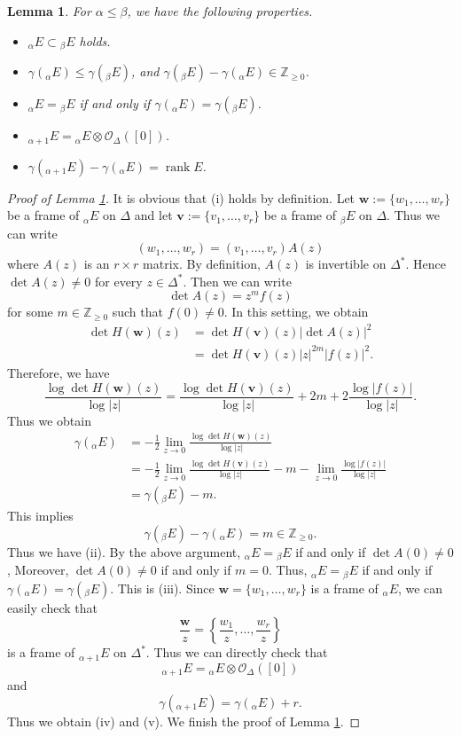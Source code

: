 \documentclass[12pt,twoside]{amsart}
\DeclareMathOperator{\rank}{rank}
\newtheorem{lem}[thm]{Lemma}
\theoremstyle{definition}
\begin{document}
\begin{lem}\label{p-lem7.8}
For $\alpha \leq \beta$, we have the following properties. 
\begin{itemize}
\item[(i)] ${}_\alpha E\subset {}_\beta E$ holds. 
\item[(ii)] $\gamma ({}_\alpha E)\leq \gamma 
({}_\beta E)$, and $\gamma ({}_\beta E)-\gamma ({}_\alpha E)\in 
\mathbb Z_{\geq 0}$. 
\item[(iii)] ${}_\alpha E={}_\beta E$ if and only if 
$\gamma({}_\alpha E)=\gamma ({}_\beta E)$. 
\item[(iv)] ${}_{\alpha +1}E={}_\alpha E\otimes \mathcal O_{\Delta}([0])$. 
\item[(v)] $\gamma ({}_{\alpha +1}E)-\gamma ({}_\alpha E)=\rank E$. 
\end{itemize}
\end{lem}

\begin{proof}[Proof of Lemma \ref{p-lem7.8}]
It is obvious that (i) holds by definition. 
Let $\bm w:=\{w_1, \ldots, w_r\}$ be a frame of ${}_\alpha E$ on 
$\Delta$ and let $\bm v:=\{v_1, \ldots, v_r\}$ be a frame of ${}_\beta E$ on $\Delta$. 
Thus we can write 
\[
(w_1, \ldots, w_r)=(v_1, \ldots, v_r)A(z)
\] 
where $A(z)$ is an $r\times r$ matrix. 
By definition, $A(z)$ is invertible on $\Delta^*$. 
Hence $\det A(z)\ne 0$ for every $z\in \Delta^*$. 
Then we can write 
\[
\det A(z)=z^mf(z)
\] 
for some $m\in \mathbb Z_{\geq 0}$ such that $f(0)\ne 0$. 
In this setting, 
we obtain 
\[
\begin{split}
\det H(\bm w)(z) &=\det H(\bm v)(z)|\det A(z)|^2\\ 
&= \det H(\bm v)(z) |z|^{2m}|f(z)|^2.  
\end{split} 
\] 
Therefore, we have 
\[
\frac{\log \det H(\bm w)(z)}{\log |z|} 
=\frac{\log \det H(\bm v)(z)}{\log |z|}+2m 
+2\frac{\log|f(z)|}{\log |z|}. 
\] 
Thus we obtain 
\[
\begin{split}
\gamma ({}_\alpha E)&= 
-\frac{1}{2} \lim_{z\to 0} \frac{\log \det H(\bm w)(z)}{\log |z|}\\ 
&=-\frac{1}{2} \lim_{z\to 0} \frac{\log \det H(\bm v)(z)}{\log |z|}
-m-\lim _{z\to 0} \frac{\log |f(z)|}{\log |z|}\\ 
&=\gamma ({}_\beta E)-m. 
\end{split}
\]
This implies 
\[
\gamma ({}_\beta E)-\gamma ({}_\alpha E)=m\in \mathbb Z_{\geq 0}. 
\] 
Thus we have (ii). 
By the above argument, ${}_\alpha E={}_\beta E$ if and only if 
$\det A(0)\ne 0$, 
Moreover, $\det A(0)\ne 0$ if and only if $m=0$. 
Thus, ${}_\alpha E={}_\beta E$ if and only if 
$\gamma ({}_\alpha E)=\gamma ({}_\beta E)$. This is (iii). 
Since $\bm w=\{w_1, \ldots, w_r\}$ is a frame of ${}_\alpha E$, 
we can easily check that 
\[
\frac{\bm w}{z}=\left\{\frac{w_1}{z}, \ldots, \frac{w_r}{z}\right\}
\] 
is a frame of ${}_{\alpha +1}E$ on $\Delta^*$. 
Thus we can directly check that 
\[
{}_{\alpha +1} E={}_\alpha E\otimes \mathcal O_\Delta([0]) 
\] 
and 
\[
\gamma ({}_{\alpha +1}E)=\gamma ({}_\alpha E)+r.
\]  
Thus we obtain (iv) and (v). We finish the proof of Lemma \ref{p-lem7.8}. 
\end{proof}
\end{document}

